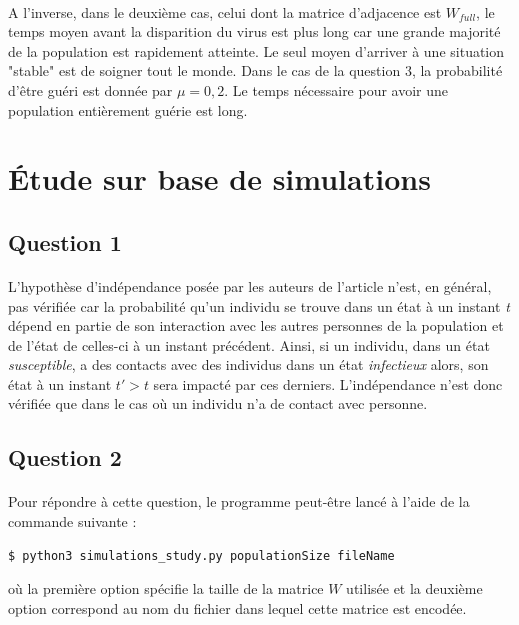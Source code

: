 \documentclass[a4paper, 12pt, oneside]{article}
\begin{document}
\paragraph{}A l'inverse, dans le deuxième cas, celui dont la matrice d'adjacence est $W_{full}$, le temps moyen avant la disparition du virus est plus long car une grande majorité de la population est rapidement atteinte. Le seul moyen d'arriver à une situation "stable" est de soigner tout le monde. Dans le cas de la question 3, la probabilité d'être guéri est donnée par $\mu = 0,2$. Le temps nécessaire pour avoir une population entièrement guérie est long.

\section{Étude sur base de simulations}

\subsection{Question 1}

\paragraph{}L'hypothèse d'indépendance posée par les auteurs de l'article n'est, en général, pas vérifiée car la probabilité qu'un individu se trouve dans un état à un instant \textit{t} dépend en partie de son interaction avec les autres personnes de la population et de l'état de celles-ci à un instant précédent. Ainsi, si un individu, dans un état \textit{susceptible}, a des contacts avec des individus dans un état \textit{infectieux} alors, son état à un instant $t' > t$ sera impacté par ces derniers. L'indépendance n'est donc vérifiée que dans le cas où un individu n'a de contact avec personne.

\subsection{Question 2}

\paragraph{}Pour répondre à cette question, le programme peut-être lancé à l'aide de la commande suivante :
\begin{lstlisting}[language=bash]
$ python3 simulations_study.py populationSize fileName 
\end{lstlisting}
\noindent où la première option spécifie la taille de la matrice $W$ utilisée et la deuxième option correspond au nom du fichier dans lequel cette matrice est encodée.
\end{document}

